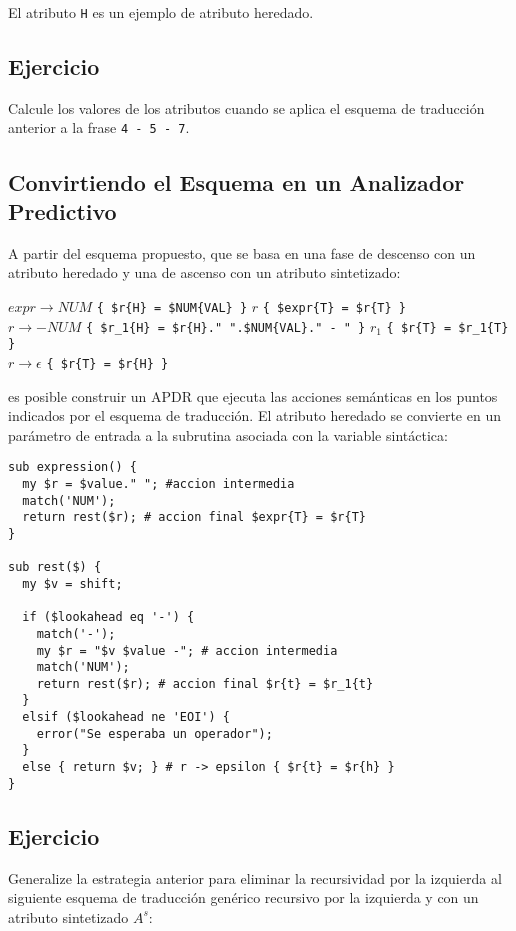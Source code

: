 El atributo \verb|H| es un ejemplo de atributo heredado.

\subsection{Ejercicio}
Calcule los valores de los atributos
cuando se aplica el esquema de traducción anterior
a la frase \verb|4 - 5 - 7|. 

\subsection{Convirtiendo el Esquema en un Analizador Predictivo}
A partir del esquema propuesto, que se basa en una fase de
descenso con un atributo heredado y una de ascenso con un atributo
sintetizado:

\vspace{0.5cm}
\noindent
$expr   \rightarrow NUM$ \verb|{ $r{H} = $NUM{VAL} }|  $r$ \verb|{ $expr{T} = $r{T} }| \\
$r   \rightarrow - NUM$ \verb|{ $r_1{H} = $r{H}." ".$NUM{VAL}." - " }| $r_1$ \verb|{ $r{T} = $r_1{T} }|\\
$r \rightarrow \epsilon$ \verb|{ $r{T} = $r{H} }|
\vspace{0.5cm}


es posible construir un APDR que ejecuta las acciones semánticas
en los puntos indicados por el esquema de traducción. El atributo heredado
se convierte en un parámetro de entrada a la subrutina asociada con la variable
sintáctica:

\begin{verbatim}
sub expression() {
  my $r = $value." "; #accion intermedia
  match('NUM'); 
  return rest($r); # accion final $expr{T} = $r{T}
}

sub rest($) {
  my $v = shift;

  if ($lookahead eq '-') {
    match('-');
    my $r = "$v $value -"; # accion intermedia
    match('NUM');
    return rest($r); # accion final $r{t} = $r_1{t}
  }
  elsif ($lookahead ne 'EOI') {
    error("Se esperaba un operador");
  }
  else { return $v; } # r -> epsilon { $r{t} = $r{h} }
}
\end{verbatim}

\subsection{Ejercicio}
Generalize la estrategia anterior 
para eliminar la recursividad por la izquierda al siguiente esquema de 
traducción genérico recursivo por la izquierda y
con un atributo sintetizado $A^s$:

